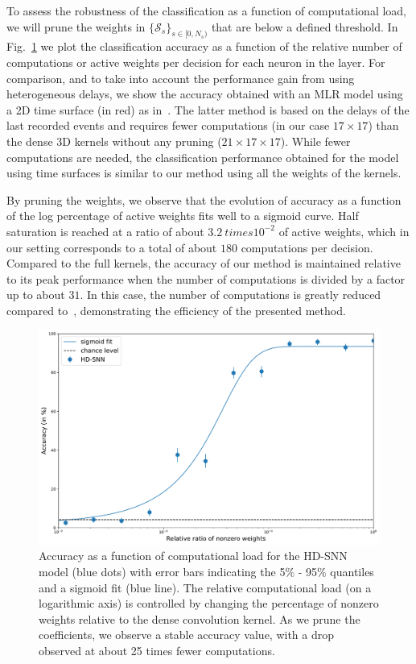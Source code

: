 \documentclass[default]{sn-jnl}%
\theoremstyle{thmstyleone}%
\theoremstyle{thmstyletwo}%
\theoremstyle{thmstylethree}%
\newcommand{\synapse}{\mathcal{S}} %
\newcommand{\ranksyn}{s} %
\newcommand{\Nsyn}{N_{s}} %
\begin{document}
To assess the robustness of the classification as a function of computational load, we will prune the weights in $\{\synapse_\ranksyn\}_{\ranksyn \in [0,\Nsyn)}$ that are below a defined threshold. In Fig.~\ref{fig:accuracy} we plot the classification accuracy as a function of the relative number of computations or active weights per decision for each neuron in the layer. For comparison, and to take into account the performance gain from using heterogeneous delays, we show the accuracy obtained with an MLR model using a 2D time surface (in red) as in~\citep{grimaldi_robust_2022}. The latter method is based on the delays of the last recorded events and requires fewer computations (in our case $17\times17$) than the dense 3D kernels without any pruning ($21\times17\times17$). While fewer computations are needed, the classification performance obtained for the model using time surfaces is similar to our method using all the weights of the kernels.

By pruning the weights, we observe that the evolution of accuracy as a function of the log percentage of active weights fits well to a sigmoid curve. Half saturation is reached at a ratio of about $3.2\ times 10^{-2}$ of active weights, which in our setting corresponds to a total of about $180$ computations per decision. Compared to the full kernels, the accuracy of our method is maintained relative to its peak performance when the number of computations is divided by a factor up to about $31$. In this case, the number of computations is greatly reduced compared to~\citep{grimaldi_robust_2022}, demonstrating the efficiency of the presented method.
%
\begin{figure}%
    \centering
    \includegraphics[width=0.95\linewidth]{figures/quant_accuracy.pdf}
    \caption{
        Accuracy as a function of computational load for the HD-SNN model (blue dots) with error bars indicating the 5\% - 95\% quantiles and a sigmoid fit (blue line). The relative computational load (on a logarithmic axis) is controlled by changing the percentage of nonzero weights relative to the dense convolution kernel. As we prune the coefficients, we observe a stable accuracy value, with a drop observed at about 25 times fewer computations.
        }
    \label{fig:accuracy}
\end{figure}
%
\end{document}
